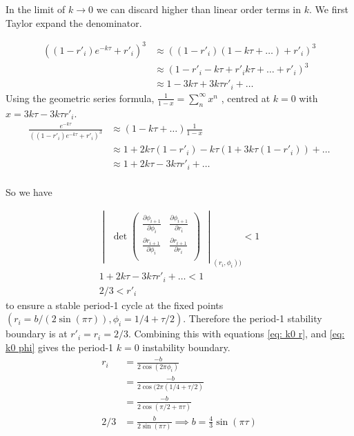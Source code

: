 In the limit of $k\rightarrow 0$ we can discard higher than linear order terms in $k$. We first Taylor expand the denominator.

\begin{align}
    ((1-r'_i)e^{-k\tau}+r'_i)^3& \approx ((1-r'_i)(1-k\tau+\dots)+r'_i)^3 \nonumber \\
    & \approx (1-r'_i-k\tau+r'_ik\tau+\dots+r'_i)^3 \nonumber \\
    & \approx 1-3k\tau+3k\tau r'_i+\dots \nonumber
\end{align}
Using the geometric series formula, $\frac{1}{1-x}=\sum_n^\infty x^n$ , centred at $k=0$ with $x=3k\tau-3k\tau r'_i$.
\begin{align}
    \frac{e^{-k\tau}}{((1-r'_i)e^{-k\tau}+r'_i)^3}& \approx (1-k\tau+\dots)\frac{1}{1-x}\nonumber \\
    & \approx 1+2k\tau(1-r'_i)-k\tau(1+3k\tau(1-r'_i))+\dots \nonumber \\
    & \approx 1+2k\tau-3k\tau r'_i + \dots \nonumber \\
\end{align} 

So we have

\begin{gather*}
\begin{vmatrix}
\det
\begin{pmatrix}
   \frac{\partial \phi_{i+1}}{\partial \phi_i} & \frac{\partial \phi_{i+1}}{\partial r_i} \\ 
\frac{\partial r_{i+1}}{\partial \phi_i} & \frac{\partial r_{i+1}}{\partial r_i} \\
\end{pmatrix}
\end{vmatrix}_{(r_i,\phi_i))}<1 \\
 1+2k\tau-3k\tau r'_i + \dots < 1 \\
 2/3 < r'_i
\end{gather*} to ensure a stable period-1 cycle at the fixed points $(r_i=b/(2\sin(\pi\tau)),\phi_i=1/4+\tau/2)$. Therefore the period-1 stability boundary is at $r'_i=r_i=2/3$. Combining this with equations \ref{eq: k0 r}, and \ref{eq: k0 phi} gives the period-1 $k=0$ instability boundary.
\begin{align*}
r_i & = \frac{-b}{2\cos(2\pi\phi_i)}\\
& = \frac{-b}{2\cos(2\pi(1/4+\tau/2)}\\
& = \frac{-b}{2\cos(\pi/2+\pi\tau)}\\
2/3 & = \frac{b}{2\sin(\pi\tau)} \implies b = \frac{4}{3}\sin(\pi\tau)
\end{align*}

